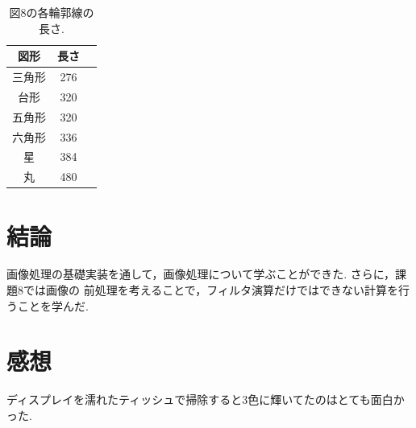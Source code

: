 \documentclass[twocolumn, 10pt,a4j]{jsarticle}
\begin{document}
  \begin{table}[htb]
    \caption{図8の各輪郭線の長さ.}
    \begin{tabular}{ccc}
      図形 & 長さ  \\ \hline
      三角形 & 276 \\
      台形 & 320 \\
      五角形 & 320 \\
      六角形 & 336 \\
      星 & 384 \\
      丸 & 480
    \end{tabular}
  \end{table}

\section{結論}
画像処理の基礎実装を通して，画像処理について学ぶことができた. さらに，課題8では画像の
前処理を考えることで，フィルタ演算だけではできない計算を行うことを学んだ.

\section{感想}
  ディスプレイを濡れたティッシュで掃除すると3色に輝いてたのはとても面白かった.
\end{document}
